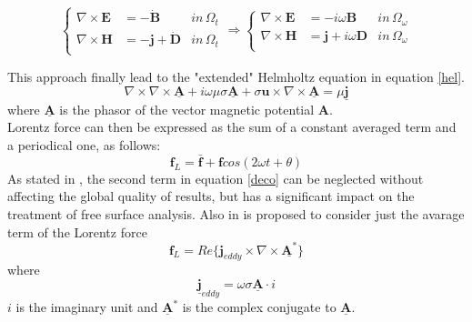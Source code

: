 \begin{equation}
  \left\{
  \begin{aligned}
  \nabla \times \textbf{E} &= -\dot{\textbf{B}} & in \, \Omega_t\\
  \nabla \times \textbf{H} &= -\textbf{j}+\dot{\textbf{D}} & in \, \Omega_t \\
  \end{aligned}
  \right.
  \Rightarrow
    \left\{
  \begin{aligned}
  \nabla \times \textbf{E} &= -i\omega \textbf{B} & in \, \Omega_{\omega}\\
  \nabla \times \textbf{H} &= \textbf{j}+i\omega \textbf{D} & in \, \Omega_{\omega} \\
  \end{aligned}
  \right.
\end{equation}





This approach finally lead to the "extended" Helmholtz equation in equation \eqref{hel}.
\begin{equation}
\nabla \times \nabla \times \underline{\textbf{A}} + i\omega \mu \sigma \underline{\textbf{A}}+\sigma \textbf{u}\times \nabla \times \underline{\textbf{A}}=\mu \underline{\textbf{j}}
\label{hel}
\end{equation}
where $\underline{\textbf{A}}$ is the phasor of the vector magnetic potential $\textbf{A}$.\\

Lorentz force can then be expressed as the sum of a constant averaged term and a periodical one, as follows:
\begin{equation}
\label{deco}
\textbf{f}_L=\bar{\textbf{f}}+\textbf{f}cos(2\omega t + \theta )
\end{equation}
As stated in \cite{Satou2009}, the second term in equation \eqref{deco} can be neglected without affecting the global quality of results, but has a significant impact on the treatment of free surface analysis. Also in \cite{Barglik2010} is proposed to consider just the avarage term of the Lorentz force
\begin{equation}
\textbf{f}_L=Re\{ \textbf{j}_{eddy}\times \nabla \times \underline{\textbf{A}^{*}} \}
\end{equation}
where
\begin{equation}
\underline{\textbf{j}}_{eddy}=\omega \sigma \underline{\textbf{A}}\cdot i
\end{equation}
$i$ is the imaginary unit and $\underline{\textbf{A}}^{*}$ is the complex conjugate to $\underline{\textbf{A}}$.
